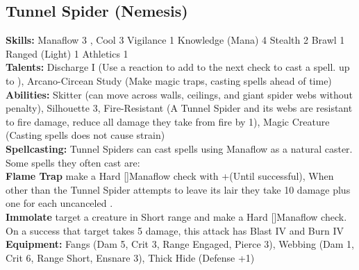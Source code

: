 \documentclass{article}
\newcommand\Hard{Hard [\Purple[3]]}
\begin{document}
\begin{multicols}{2}
{\subsection{Tunnel Spider (Nemesis)}
\begin{center}
\end{center}
\textbf{Skills:}
Manaflow 3 \Yellow[3]\Green[2],
Cool 3  \Yellow[2]\Green[2]
Vigilance 1  \Yellow[2]\Green[2]
Knowledge (Mana) 4  \Yellow[2]\Green[2]
Stealth 2  \Yellow[2]\Green[1]
Brawl 1  \Yellow[1]\Green[2]
Ranged (Light) 1  \Yellow[1]\Green[2]
Athletics 1 \Yellow[1]\Green[2]
\\\textbf{Talents:}
Discharge I (Use a reaction to add \Advantage\Advantage to the next check to cast a spell. up to \Advantage\Advantage\Advantage\Advantage),
Arcano-Circean Study (Make magic traps, casting spells ahead of time)
\\\textbf{Abilities:}
Skitter (can move across walls, ceilings, and giant spider webs without penalty),
Silhouette 3,
Fire-Resistant (A Tunnel Spider and its webs are resistant to fire damage, reduce all damage they take from fire by 1),
Magic Creature (Casting spells does not cause strain)
\\\textbf{Spellcasting:} Tunnel Spiders can cast spells using Manaflow as a natural caster. Some spells they often cast are:
\\\textbf{Flame Trap} make a \Hard Manaflow check with +\Advantage\Advantage\Advantage\Advantage (Until successful), When other than the Tunnel Spider attempts to leave its lair they take 10 damage plus one for each uncanceled \Success.
\\\textbf{Immolate} target a creature in Short range and make a \Hard Manaflow check. On a success that target takes 5 damage, this attack has Blast IV and Burn IV
\\\textbf{Equipment:} Fangs (Dam 5, Crit 3, Range Engaged, Pierce 3), Webbing (Dam 1, Crit 6, Range Short, Ensnare 3), Thick Hide (Defense +1)
}


\vbox{
}
\end{multicols}
\end{document}
